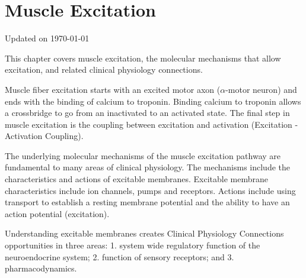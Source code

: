 \chapter{Muscle Excitation}\label{chp:excitation}
Updated on \today

\minitoc

This chapter covers muscle excitation, the molecular mechanisms that allow excitation, and related clinical physiology connections. 

Muscle fiber excitation starts with an excited motor axon ($\alpha$-motor neuron) and ends with the binding of calcium to troponin. Binding calcium to troponin allows a crossbridge to go from an inactivated to an activated state. The final step in muscle excitation is the coupling between excitation and activation (Excitation - Activation Coupling). 

The underlying molecular mechanisms of the muscle excitation pathway are fundamental to many areas of clinical physiology. The mechanisms include the characteristics and actions of excitable membranes. Excitable membrane characteristics include ion channels, pumps and receptors. Actions include using transport to establish a resting membrane potential and the ability to have an action potential (excitation). 

Understanding excitable membranes creates Clinical Physiology Connections opportunities in three areas: 1. system wide regulatory function of the neuroendocrine system; 2. function of sensory receptors; and 3. pharmacodynamics.

\vspace{5mm}

